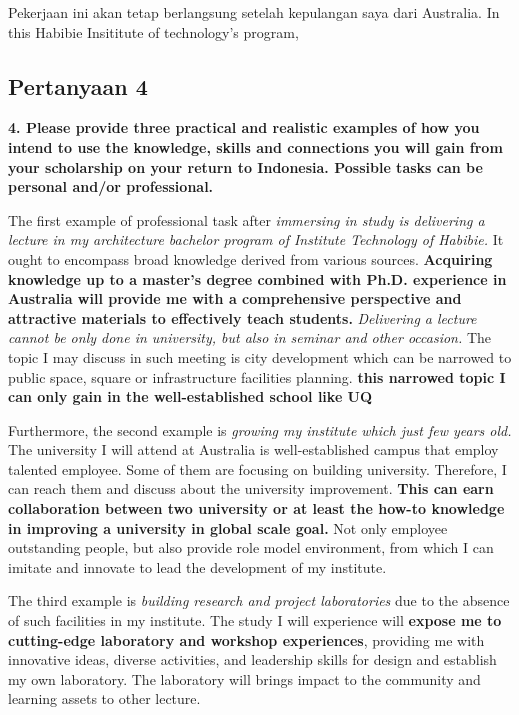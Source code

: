 \documentclass[../main.tex]{subfiles}
\begin{document}
Pekerjaan ini akan tetap berlangsung setelah kepulangan saya dari Australia.
In this Habibie Insititute of technology's program,





\subsection*{Pertanyaan 4}%
\label{sub:Pertanyaan 4}

\textbf{4. Please provide three practical and realistic examples of how you intend to use the knowledge, skills and connections you will gain from your scholarship on your return to Indonesia. Possible tasks can be personal and/or professional.}

The first example of professional task after \textit{immersing in study is delivering a lecture in my architecture bachelor program of Institute Technology of Habibie.}
It ought to encompass broad knowledge derived from various sources. \textbf{Acquiring knowledge up to a master's degree combined with Ph.D. experience in Australia will provide me with a comprehensive perspective and attractive materials to effectively teach students.}
\textit{Delivering a lecture cannot be only done in university, but also in seminar and other occasion.} The topic I may discuss in such meeting is city development which can be narrowed to public space, square or infrastructure facilities planning. \textbf{this narrowed topic I can only gain in the well-established school like UQ}

Furthermore, the second example is \textit{growing my institute which just few years old.} The university I will attend at Australia is well-established campus that employ talented employee.
Some of them are focusing on building university. Therefore, I can reach them and discuss about the university improvement. \textbf{This can earn collaboration between two university or at least the how-to knowledge in improving a university in global scale goal.}
Not only employee outstanding people, but also provide role model environment, from which I can imitate and innovate to lead the development of my institute.

The third example is \textit{building research and project laboratories} due to the absence of such facilities in my institute.
The study I will experience will \textbf{expose me to cutting-edge laboratory and workshop experiences}, providing me with innovative ideas, diverse activities, and leadership skills for design and establish my own laboratory.
The laboratory will brings impact to the community and learning assets to other lecture.
\end{document}
